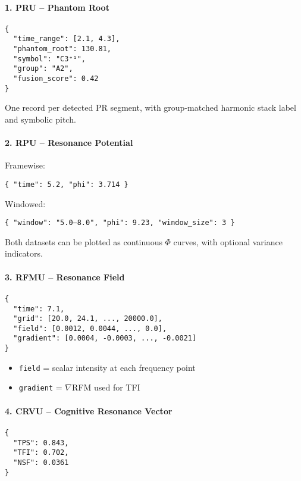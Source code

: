 \documentclass{article}
\begin{document}
\paragraph{1. PRU – Phantom Root}
\begin{verbatim}
{
  "time_range": [2.1, 4.3],
  "phantom_root": 130.81,
  "symbol": "C3⁺¹",
  "group": "A2",
  "fusion_score": 0.42
}
\end{verbatim}

One record per detected PR segment, with group-matched harmonic stack label and symbolic pitch.

\paragraph{2. RPU – Resonance Potential}

Framewise:
\begin{verbatim}
{ "time": 5.2, "phi": 3.714 }
\end{verbatim}

Windowed:
\begin{verbatim}
{ "window": "5.0–8.0", "phi": 9.23, "window_size": 3 }
\end{verbatim}

Both datasets can be plotted as continuous $\Phi$ curves, with optional variance indicators.

\paragraph{3. RFMU – Resonance Field}
\begin{verbatim}
{
  "time": 7.1,
  "grid": [20.0, 24.1, ..., 20000.0],
  "field": [0.0012, 0.0044, ..., 0.0],
  "gradient": [0.0004, -0.0003, ..., -0.0021]
}
\end{verbatim}

\begin{itemize}
    \item \texttt{field} = scalar intensity at each frequency point
    \item \texttt{gradient} = $\nabla$RFM used for TFI
\end{itemize}

\paragraph{4. CRVU – Cognitive Resonance Vector}
\begin{verbatim}
{
  "TPS": 0.843,
  "TFI": 0.702,
  "NSF": 0.0361
}
\end{verbatim}
\end{document}

